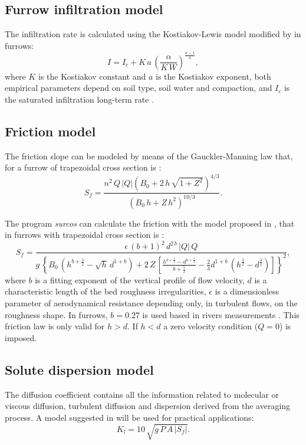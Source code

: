 \documentclass[review,authoryear]{elsarticle}
\newcommand{\eq}[2]{\begin{equation}\label{#2}#1\end{equation}}
\newcommand{\PA}[1] {\left(#1\right)}
\newcommand{\C}[1] {\left[#1\right]}
\newcommand{\LL}[1] {\left\{#1\right\}}
\newcommand{\ABS}[1] {\left|#1\right|}
\begin{document}
\subsection{Furrow infiltration model}

The infiltration rate is calculated using the Kostiakov-Lewis model modified by
\cite{JaviSurcos1} in furrows:
\eq{I=I_c+K\,a\,\PA{\frac{\alpha}{K\,W}}^\frac{a-1}{a},}
{EqKostiakovLewisSurcosi}
where $K$ is the Kostiakov constant and $a$ is the Kostiakov exponent, both
empirical parameters depend on soil type, soil water and compaction, and $I_c$
is the saturated infiltration long-term rate \citep{WalkerSkogerboe87}.

\subsection{Friction model}

The friction slope can be modeled by means of the Gauckler-Manning law
\citep{Gauckler,Manning} that, for a furrow of trapezoidal cross section is
\citep{JaviSurcos1}:
\eq
{
	S_f=\frac{n^2\,Q\,|Q|\PA{B_0+2\,h\,\sqrt{1+Z^2}}^{4/3}}
	{\PA{B_0\,h+Z\,h^2}^{10/3}}.
}{EqManning}

The program \emph{surcos} can calculate the friction with the model proposed in
\cite{JaviFriccion,JaviFriccion2}, that in furrows with trapezoidal cross
section is \citep{JaviSurcos1}:
\eq
{
	S_f=\frac{\epsilon\,(b+1)^2\,d^{2\,b}\,|Q|\,Q}
	{g\,\LL{B_0\,\PA{h^{b+\frac32}-\sqrt{h}\,d^{1+b}}+
	2\,Z\,\C{\frac{h^{b+\frac52}-d^{b+\frac52}}{b+\frac52}-
	\frac{2}{3}d^{1+b}\,\PA{h^\frac32-d^\frac32}}}^2},
}{EqSf}
where $b$ is a fitting exponent of the vertical profile of flow velocity, $d$ is
a characteristic length of the bed roughness irregularities, $\epsilon$ is a
dimensionless parameter of aerodynamical resistance depending only, in turbulent
flows, on the roughness shape. In furrows, $b=0.27$ is used based in rivers
measurements \citep{JaviFriccion}. This friction law is only valid for $h>d$. If
$h<d$ a zero velocity condition ($Q=0$) is imposed.

\subsection{Solute dispersion model}

The diffusion coefficient contains all the information related to molecular or
viscous diffusion, turbulent diffusion and dispersion derived from the averaging
process. A model suggested in \cite{Rutherford94} will be used for practical
applications:
\eq{K_l=10\,\sqrt{g\,P\,A\,\ABS{S_f}}.}{EqRutherford}
\end{document}
